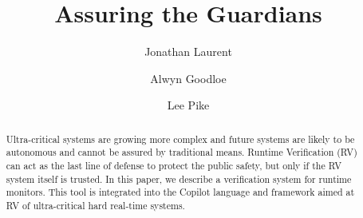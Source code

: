 \documentclass{llncs}
\begin{document}
\title{Assuring the Guardians} 
%
\author{Jonathan Laurent \and Alwyn Goodloe \and Lee
  Pike
 }
%
%
%

\maketitle              %

\begin{abstract}
  Ultra-critical systems are growing more complex and future systems
  are likely to be autonomous and cannot be assured by traditional
  means.  Runtime Verification (RV) can act as the last line of
  defense to protect the public safety, but only if the RV system
  itself is trusted.  In this paper, we describe a verification system
  for runtime monitors. This tool is integrated into the Copilot
  language and framework aimed at RV of ultra-critical hard real-time
  systems.
\end{abstract}





 


 




\end{document}
